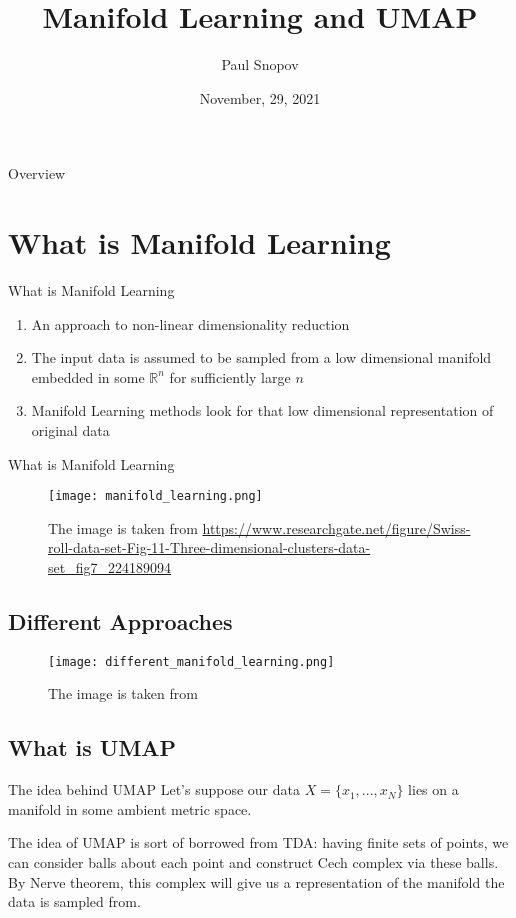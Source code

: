 \documentclass{beamer}
\title{Manifold Learning and UMAP}
\author{Paul Snopov}
\institute{MIPT \& IITP}
\date{November, 29, 2021}
\theoremstyle{named}
\begin{document}
\frame{\titlepage}

\begin{frame}{Overview}
\tableofcontents
\end{frame}

\section{What is Manifold Learning}

\begin{frame}{What is Manifold Learning}
	\begin{enumerate}
		\item An approach to non-linear dimensionality reduction
		\item The input data is assumed to be sampled from a low dimensional manifold embedded in some $\mathbb{R}^n$ for sufficiently large $n$
		\item Manifold Learning methods look for that low dimensional representation of original data
	\end{enumerate}
\end{frame}

\begin{frame}{What is Manifold Learning}
	\begin{figure}[htp]
		\centering
		\texttt{[image: manifold\_learning.png]}
		\caption{The image is taken from \url{https://www.researchgate.net/figure/Swiss-roll-data-set-Fig-11-Three-dimensional-clusters-data-set_fig7_224189094}}
	\end{figure}
\end{frame}

\subsection{Different Approaches}

\begin{frame}
		\begin{figure}[htp]
		\centering
		\texttt{[image: different\_manifold\_learning.png]}
		\caption{The image is taken from \cite{docs}}
	\end{figure}
\end{frame}

\subsection{What is UMAP}

\begin{frame}{The idea behind UMAP}
	Let's suppose our data $X = \{ x_1, ..., x_N \}$ lies on a manifold in some ambient metric space. 
	
	The idea of UMAP is sort of borrowed from TDA: having finite sets of points, we can consider balls about each point and construct Cech complex via these balls. By Nerve theorem, this complex will give us a representation of the manifold the data is sampled from.
\end{frame}
\end{document}
